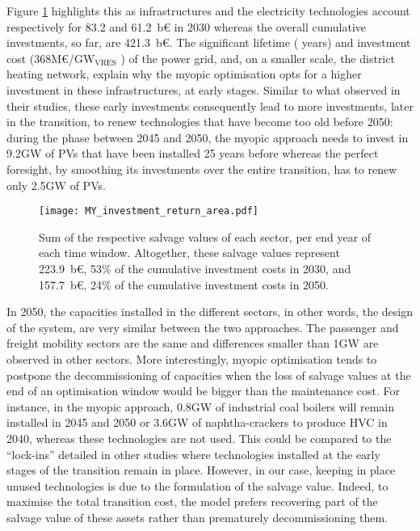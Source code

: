 Figure \ref{fig:my_pestd_inv_return_area} highlights this as infrastructures and the electricity technologies account respectively for 83.2 and 61.2~b€ in 2030 whereas the overall cumulative investments, so far, are 421.3~b€. The significant lifetime ( years) and investment cost (\ie 368M€/GW$_\text{VRES}$ \cite{readthedocs_pathway}) of the power grid, and, on a smaller scale, the district heating network, explain why the myopic optimisation opts for a higher investment in these infrastructures, at early stages. Similar to what \citet{keppo2010short} observed in their studies, these early investments consequently lead to more investments, later in the transition, to renew technologies that have become too old before 2050: during the phase between 2045 and 2050, the myopic approach needs to invest in 9.2GW of PVs that have been installed 25 years before whereas the perfect foresight, by smoothing its investments over the entire transition, has to renew only 2.5GW of PVs. 

\begin{figure}[!htbp]
\centering
\texttt{[image: MY\_investment\_return\_area.pdf]}
\caption{Sum of the respective salvage values of each sector, per end year of each time window. Altogether, these salvage values represent 223.9~b€, 53\% of the cumulative investment costs in 2030, and 157.7~b€, 24\% of the cumulative investment costs in 2050.}
\label{fig:my_pestd_inv_return_area}
\end{figure}

In 2050, the capacities installed in the different sectors, in other words, the design of the system, are very similar between the two approaches. The passenger and freight mobility sectors are the same and differences smaller than 1GW are observed in other sectors. More interestingly, myopic optimisation tends to postpone the decommissioning of capacities when the loss of salvage values at the end of an optimisation window would be bigger than the maintenance cost. For instance, in the myopic approach, 0.8GW of industrial coal boilers will remain installed in 2045 and 2050 or 3.6GW of naphtha-crackers to produce HVC in 2040, whereas these technologies are not used. This could be compared to the ``lock-ins'' detailed in other studies \cite{heuberger2018impact,keppo2010short} where technologies installed at the early stages of the transition remain in place. However, in our case, keeping in place unused technologies is due to the formulation of the salvage value. Indeed, to maximise the total transition cost, the model prefers recovering part of the salvage value of these assets rather than prematurely decommissioning them.

